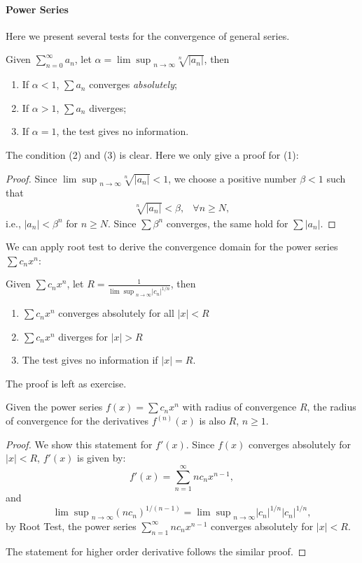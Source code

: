 \paragraph{Power Series} 
Here we present several tests for the convergence of general series.
\begin{theorem}
Given $\sum_{n=0}^\infty a_n$, let $\alpha={\lim\sup}_{n\to\infty}\sqrt[n]{|a_n|}$, then
\begin{enumerate}
\item
If $\alpha<1$, $\sum a_n$ converges \emph{absolutely};
\item
If $\alpha >1$, $\sum a_n$ diverges;
\item
If $\alpha=1$, the test gives no information.
\end{enumerate}
\end{theorem}
The condition (2) and (3) is clear. Here we only give a proof for (1):
\begin{proof}
Since ${\lim\sup}_{n\to\infty}\sqrt[n]{|a_n|}<1$, we choose a positive number $\beta<1$ such that
\[
\begin{array}{ll}
\sqrt[n]{|a_n|}<\beta,
&\forall
n\ge N,
\end{array}
\]
i.e., $|a_n|<\beta^n$ for $n\ge N$. Since $\sum \beta^n$ converges, the same hold for $\sum|a_n|$.
\end{proof}
We can apply root test to derive the convergence domain for the power series $\sum c_nx^n$:
\begin{proposition}
Given $\sum c_nx^n$, let $R=\frac{1}{{\lim\sup}_{n\to\infty}|c_n|^{1/n}}$, then
\begin{enumerate}
\item
$\sum c_nx^n$ converges absolutely for all $|x|<R$
\item
$\sum c_nx^n$ diverges for $|x|>R$
\item
The test gives no information if $|x|=R$.
\end{enumerate}
\end{proposition}
The proof is left as exercise.
\begin{proposition}
Given the power series $f(x)=\sum c_nx^n$ with radius of convergence $R$, the radius of convergence for the derivatives $f^{(n)}(x)$ is also $R$, $n\ge1$.
\end{proposition}
\begin{proof}
We show this statement for $f'(x)$. Since $f(x)$ converges absolutely for $|x|<R$, $f'(x)$ is given by:
\[
f'(x)=\sum_{n=1}^\infty nc_nx^{n-1},
\]
and
\[
{\lim\sup}_{n\to\infty}(nc_n)^{1/(n-1)}={\lim\sup}_{n\to\infty}|c_n|^{1/n}|c_n|^{1/n},
\]
by Root Test, the power series $\sum_{n=1}^\infty nc_nx^{n-1}$ converges absolutely for $|x|<R$.

The statement for higher order derivative follows the similar proof.
\end{proof}
